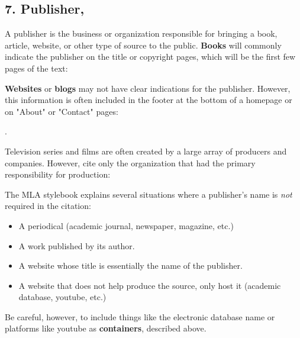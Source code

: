 

\subsection{7. Publisher,}

A publisher is the business or organization responsible for bringing a book, article, website, or other type of source to the public. \textbf{Books} will commonly indicate the publisher on the title or copyright pages, which will be the first few pages of the text: \bigskip 

\bigskip

\noindent \textbf{Websites} or \textbf{blogs} may not have clear indications for the publisher. However, this information is often included in the footer at the bottom of a homepage or on "About" or "Contact" pages: \medskip

. \bigskip

\noindent Television series and films are often created by a large array of producers and companies. However, cite only the organization that had the primary responsibility for production:\bigskip 

\bigskip



\begin{center}
\begin{tcolorbox}[colframe=oyster, coltitle=black, sharp corners, title=\ding{52} When \emph{not} to include the publisher]
The MLA stylebook explains several situations where a publisher's name is \emph{not} required in the citation: 

\begin{itemize}
\item A periodical (academic journal, newspaper, magazine, etc.)
\item A work published by its author.
\item A website whose title is essentially the name of the publisher.
\item A website that does not help produce the source, only host it (academic database, youtube, etc.)
\end{itemize}

\medskip

Be careful, however, to include things like the electronic database name or platforms like youtube as \textbf{containers}, described above.


\end{tcolorbox}
\end{center}




